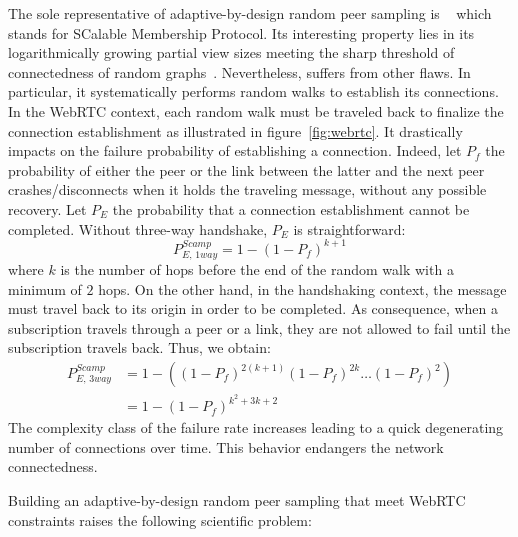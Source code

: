 The sole representative of adaptive-by-design random peer sampling is
\SCAMP{}~\cite{ganesh2001scamp,ganesh2003peer} which stands for
SCalable Membership Protocol. Its interesting property lies in its
logarithmically growing partial view sizes meeting the sharp threshold
of connectedness of random
graphs~\cite{erdos1959random}. Nevertheless, \SCAMP{} suffers from
other flaws. In particular, it systematically performs random walks to
establish its connections. In the WebRTC context, each random walk
must be traveled back to finalize the connection establishment as
illustrated in figure~\ref{fig:webrtc}. It drastically impacts on the
\SCAMP{} failure probability of establishing a connection. Indeed, let
$P_f$ the probability of either the peer or the link between the
latter and the next peer crashes/disconnects when it holds the
traveling message, without any possible recovery. Let $P_E$ the
probability that a connection establishment cannot be
completed. Without three-way handshake, $P_E$ is straightforward:
\begin{equation} P_{E,\,1way}^{Scamp}=1-(1- P_f)^{k+1} \end{equation} where $k$
is the number of hops before the end of the random walk with a minimum of $2$
hops. On the other hand, in the handshaking context, the message must travel
back to its origin in order to be completed. As consequence, when a
subscription travels through a peer or a link, they are not allowed to fail
until the subscription travels back. Thus, we obtain:
\begin{align} P_{E,\,3way}^{Scamp} &=1 - ((1-P_f)^{2(k+1)} (1-P_f)^{2k}
                                     \ldots (1-P_f)^2) \nonumber \\
                                   &=1-(1-P_f)^{k^2+3k+2}
\end{align}
The complexity class of the \SCAMP{} failure rate increases leading to a quick
degenerating number of connections over time. This behavior endangers the
network connectedness.

Building an adaptive-by-design random peer sampling that meet WebRTC
constraints raises the following scientific problem:

